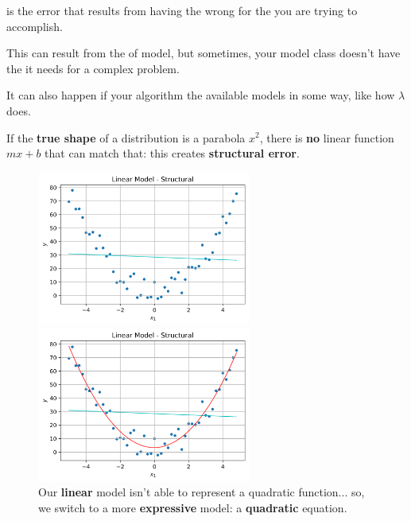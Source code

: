         \begin{definition}
             is the error that results from having the wrong  for the  you are trying to accomplish.
            
            This can result from the  of model, but sometimes, your model class doesn't have the  it needs for a complex problem.
            
            It can also happen if your algorithm  the available models in some way, like how $\lambda$ does.
        \end{definition}
        
        \miniex If the \textbf{true shape} of a distribution is a parabola $x^2$, there is \textbf{no} linear function $mx+b$ that can match that: this creates \textbf{structural error}.
        
        \begin{figure}[H]
        
                \includegraphics[width=70mm,scale=0.5]{images/regression_images/Structural_Linear_Model.png}

                \includegraphics[width=70mm,scale=0.5]{images/regression_images/Structural_Quad_Model.png}

        
            \caption*{Our \textbf{linear} model isn't able to represent a quadratic function... so, we switch to a more \textbf{expressive} model: a \textbf{quadratic} equation.}
        \end{figure}
        
